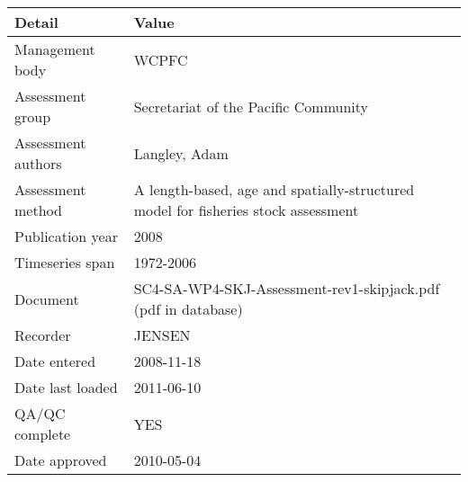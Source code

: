 \begin{table}[htb]
\centering
\begin{tabular}{lp{7cm}}
\toprule
Detail & Value \\
\midrule
Management body    & WCPFC                                                                             \\
Assessment group   & Secretariat of the Pacific Community                                              \\
Assessment authors & Langley, Adam                                                                     \\
Assessment method  & A length-based, age and spatially-structured model for fisheries stock assessment \\
Publication year   & 2008                                                                              \\
Timeseries span    & 1972-2006                                                                         \\
Document           & SC4-SA-WP4-SKJ-Assessment-rev1-skipjack.pdf (pdf in database)                     \\
Recorder           & JENSEN                                                                            \\
Date entered       & 2008-11-18                                                                        \\
Date last loaded   & 2011-06-10                                                                        \\
QA/QC complete     & YES                                                                               \\
Date approved      & 2010-05-04                                                                        \\
\bottomrule
\end{tabular}
\label{tab:assessdet}
\end{table}
